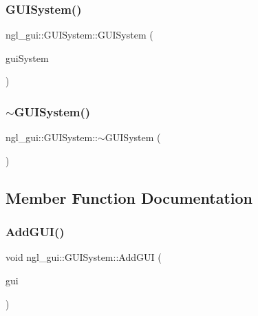 \subsubsection{\texorpdfstring{G\+U\+I\+System()}{GUISystem()}\hspace{0.1cm}{\footnotesize\ttfamily [3/3]}}
{\footnotesize\ttfamily ngl\+\_\+gui\+::\+G\+U\+I\+System\+::\+G\+U\+I\+System (\begin{DoxyParamCaption}\item[{\mbox{\hyperlink{classngl__gui_1_1_g_u_i_system}{G\+U\+I\+System}} \&\&}]{gui\+System }\end{DoxyParamCaption})\hspace{0.3cm}{\ttfamily [default]}}

\mbox{\label{classngl__gui_1_1_g_u_i_system_aea572afaf1840acb0da5da07a1eb551b}} 
\subsubsection{\texorpdfstring{$\sim$\+G\+U\+I\+System()}{~GUISystem()}}
{\footnotesize\ttfamily ngl\+\_\+gui\+::\+G\+U\+I\+System\+::$\sim$\+G\+U\+I\+System (\begin{DoxyParamCaption}{ }\end{DoxyParamCaption})}



\subsection{Member Function Documentation}
\mbox{\label{classngl__gui_1_1_g_u_i_system_a4743d6da816cae8e319fe9351854731f}} 
\subsubsection{\texorpdfstring{Add\+G\+U\+I()}{AddGUI()}}
{\footnotesize\ttfamily void ngl\+\_\+gui\+::\+G\+U\+I\+System\+::\+Add\+G\+UI (\begin{DoxyParamCaption}\item[{\mbox{\hyperlink{classngl__gui_1_1_g_u_i}{G\+UI}} $\ast$}]{gui }\end{DoxyParamCaption})}

